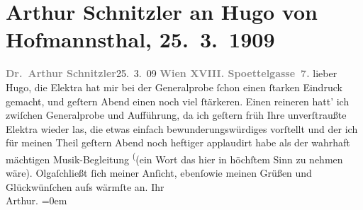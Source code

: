 

         
         \renewcommand{\erwaehntePersonen}{Personen: Hugo von Hofmannsthal, Olga Schnitzler, Richard Strauss}
         \renewcommand{\erwaehnteOrte}{Orte: Edmund-Weiß-Gasse, Wien}
         \renewcommand{\erwaehnteWerke}{Werke: Elektra (op. 58)}
               \section[Arthur Schnitzler an Hugo von Hofmannsthal, 25. 3. 1909]{ Arthur Schnitzler an Hugo von Hofmannsthal, 25. 3. 1909}\nopagebreak{}\rehead{ }\begin{ledgroupsized}[t]{13cm}\normalsize\beginnumbering \toendnotes[C]{\smallbreak\pagebreak[2]} 
\pstart
           \noindent{}{\pb}\textcolor{gray}{\textbf{Dr. Arthur Schnitzler}}\hfill 25. 3. 09\pend
           \pstart
           \textcolor{gray}{\textbf{Wien XVIII. Spoettelgasse 7.}}\pend
           \pstart
           lieber Hugo, die Elektra hat
               mir bei der Generalprobe ſchon einen ſtarken Eindruck gemacht, und geſtern
                  Abend einen noch viel ſtärkeren. Einen reineren hatt’ ich zwiſchen
               Generalprobe und Aufführung, da ich geſtern früh Ihre unverſtraußte Elektra wieder
               las, die etwas einfach bewunderungs{\pb}würdiges vorſtellt
               und der ich für meinen Theil geſtern \introOben{}Abend\introOben{} noch heftiger applaudirt habe als der wahrhaft mächtigen Musik-Begleitung \substVorne{}\textsuperscript{(}\substDazwischen{}(ein Wort\substHinten{} das hier in höchſtem Sinn zu nehmen wäre).\pend
           \pstart
           Olgaſchließt ſich meiner Anſicht, ebenſowie meinen
               Grüßen und Glückwünſchen aufs wärmſte an.\pend
           \pstart
           Ihr{\\[\baselineskip]}\spacefill\mbox{Arthur.}\pend
           \leftskip=0em{}
         
         \endnumbering{}\end{ledgroupsized}  \newcommand{\dateiname}{L01834}\newcommand{\titel}{Arthur Schnitzler an Hugo von Hofmannsthal, 25. 3. 1909}\newcommand{\editorInnen}{Martin Anton Müller und Gerd-Hermann Susen}
      